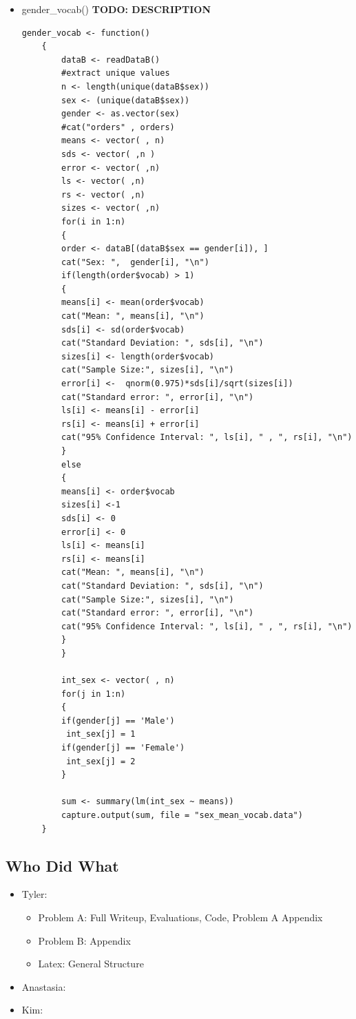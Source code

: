 \documentclass[11pt]{article}  %
\begin{document}
\begin{itemize}
    \label{sec:GV}
    \item gender\_vocab() \textbf{TODO: DESCRIPTION}
    \begin{lstlisting}[basicstyle=\small]
    gender_vocab <- function()
    {
        dataB <- readDataB()
        #extract unique values
        n <- length(unique(dataB$sex))
        sex <- (unique(dataB$sex))
        gender <- as.vector(sex)
        #cat("orders" , orders)
        means <- vector( , n)
        sds <- vector( ,n )
        error <- vector( ,n)
        ls <- vector( ,n)
        rs <- vector( ,n)
        sizes <- vector( ,n)
        for(i in 1:n)
        {
        order <- dataB[(dataB$sex == gender[i]), ]
        cat("Sex: ",  gender[i], "\n")
        if(length(order$vocab) > 1)
        {
        means[i] <- mean(order$vocab)
        cat("Mean: ", means[i], "\n")
        sds[i] <- sd(order$vocab)
        cat("Standard Deviation: ", sds[i], "\n")
        sizes[i] <- length(order$vocab)
        cat("Sample Size:", sizes[i], "\n")
        error[i] <-  qnorm(0.975)*sds[i]/sqrt(sizes[i])
        cat("Standard error: ", error[i], "\n")
        ls[i] <- means[i] - error[i]
        rs[i] <- means[i] + error[i]
        cat("95% Confidence Interval: ", ls[i], " , ", rs[i], "\n")
        }
        else
        {
        means[i] <- order$vocab
        sizes[i] <-1
        sds[i] <- 0
        error[i] <- 0
        ls[i] <- means[i]
        rs[i] <- means[i]
        cat("Mean: ", means[i], "\n")
        cat("Standard Deviation: ", sds[i], "\n")
        cat("Sample Size:", sizes[i], "\n")
        cat("Standard error: ", error[i], "\n")
        cat("95% Confidence Interval: ", ls[i], " , ", rs[i], "\n")
        }
        }
        
        int_sex <- vector( , n)
        for(j in 1:n)
        {
        if(gender[j] == 'Male')
         int_sex[j] = 1
        if(gender[j] == 'Female')
         int_sex[j] = 2
        }
        
        sum <- summary(lm(int_sex ~ means))
        capture.output(sum, file = "sex_mean_vocab.data")
    }
    \end{lstlisting}

\end{itemize}
    
\subsection{Who Did What}
\begin{itemize}
    \item Tyler:
    \begin{itemize}
        \item Problem A: Full Writeup, Evaluations, Code, Problem A Appendix
        \item Problem B: Appendix
        \item Latex: General Structure
    \end{itemize}
    \item Anastasia:
    \item Kim:
\end{itemize}
\label{sec:wdw}
\end{document}

